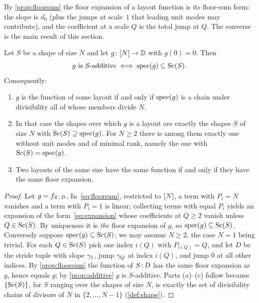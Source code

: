 By \cref{prop:floorsum} the floor expansion of a layout function is its floor-sum form: the slope
is $d_0$ (plus the jumps at scale~$1$ that leading unit modes may contribute), and the coefficient
at a scale $Q$ is the total jump at $Q$. The converse is the main result of this section.

\begin{theorem}\label{thm:spectrum}
Let $S$ be a shape of size $N$ and let $g\colon[N]\to\mathbb{D}$ with $g(0)=0$. Then
\[ g\text{ is $S$-additive}\iff\operatorname{spec}(g)\subseteq\operatorname{Sc}(S). \]
Consequently:
\begin{enumerate}[label=(\alph*),itemsep=1pt]
\item $g$ is the function of some layout if and only if $\operatorname{spec}(g)$ is a chain under divisibility
 all of whose members divide $N$.
\item In that case the shapes over which $g$ is a layout are exactly the shapes $S$ of size $N$
 with $\operatorname{Sc}(S)\supseteq\operatorname{spec}(g)$. For $N\ge2$ there is among them exactly one without unit modes
 and of minimal rank, namely the one with $\operatorname{Sc}(S)=\operatorname{spec}(g)$.
\item Two layouts of the same size have the same function if and only if they have the same floor
 expansion.
\end{enumerate}
\end{theorem}
\begin{proof}
Let $g=f_{S\,{:}\,D}$. In~\eqref{eq:floorsum}, restricted to $[N]$, a term with $P_i=N$
vanishes and a term with $P_i=1$ is linear; collecting terms with equal $P_i$ yields an expansion
of the form~\eqref{eq:expansion} whose coefficients at $Q\ge2$ vanish unless $Q\in\operatorname{Sc}(S)$. By
uniqueness it is \emph{the} floor expansion of $g$, so $\operatorname{spec}(g)\subseteq\operatorname{Sc}(S)$. Conversely
suppose $\operatorname{spec}(g)\subseteq\operatorname{Sc}(S)$; we may assume $N\ge2$, the case $N=1$ being trivial. For each $Q\in\operatorname{Sc}(S)$ pick one index $i(Q)$ with $P_{i(Q)}=Q$,
and let $D$ be the stride tuple with slope $\gamma_1$, jump $\gamma_Q$ at index $i(Q)$, and jump
$0$ at all other indices. By \cref{prop:floorsum} the function of $S\,{:}\,D$ has the same floor
expansion as $g$, hence equals $g$; by \cref{prop:additive} $g$ is $S$-additive. Parts (a)--(c)
follow because $\{\operatorname{Sc}(S)\}$, for $S$ ranging over the shapes of size $N$, is exactly the set of
divisibility chains of divisors of $N$ in $\{2,\dots,N-1\}$ (\cref{def:shape}).
\end{proof}

